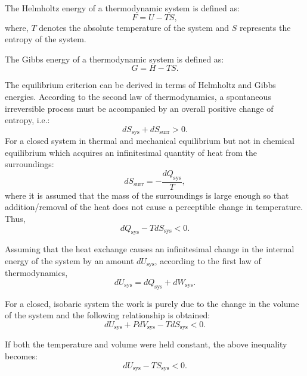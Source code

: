     The Helmholtz energy of a thermodynamic system is defined as:
    \begin{equation}
        F = U - TS,
    \end{equation}
    where, $T$ denotes the absolute temperature of the system and $S$ represents the entropy of the system.

    The Gibbs energy of a thermodynamic system is defined as:
    \begin{equation}
        G = H - TS.
    \end{equation}

    The equilibrium criterion can be derived in terms of Helmholtz and Gibbs energies. According to the second law of thermodynamics, a spontaneous irreversible process must be accompanied by an overall positive change of entropy, i.e.:
    \begin{equation}
        dS_\text{sys} + dS_\text{surr} > 0.
    \end{equation}
    For a closed system in thermal and mechanical equilibrium but not in chemical equilibrium which acquires an infinitesimal quantity of heat from the surroundings:
    \begin{equation}
        dS_\text{surr} = -\frac{dQ_\text{sys}}{T},
    \end{equation}
    where it is assumed that the mass of the surroundings is large enough so that addition/removal of the heat does not cause a perceptible change in temperature. Thus,
    \begin{equation}
        {dQ_\text{sys}} - T dS_\text{sys}  < 0.
    \end{equation}

    Assuming that the heat exchange causes an infinitesimal change in the internal energy of the system by an amount $dU_\text{sys}$, according to the first law of thermodynamics,
    \begin{equation}
        {dU_\text{sys}} = {dQ_\text{sys}} + {dW_\text{sys}}.
    \end{equation}

    For a closed, isobaric system the work is purely due to the change in the volume of the system and the following relationship is obtained:
    \begin{equation}
        {dU_\text{sys}} + P{dV_\text{sys}} - T{dS_\text{sys}} < 0.
    \end{equation}

    If both the temperature and volume were held constant, the above inequality becomes:
    \begin{equation}
        d{U_\text{sys} - TS_\text{sys} } < 0.
    \end{equation}

